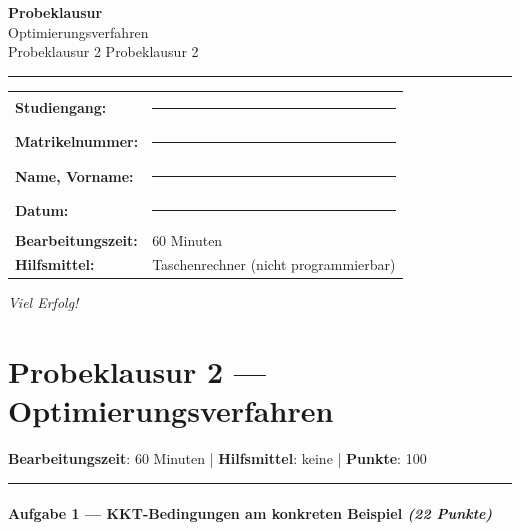 \documentclass[11pt, a4paper]{article}
\providecommand{\nichttitle}{Probeklausur}
\providecommand{\nichtsubtitle}{}
\renewcommand{\nichttitle}{Optimierungsverfahren}
\renewcommand{\nichtsubtitle}{Probeklausur 2}
\begin{document}
\thispagestyle{empty}
\begin{center}
\vspace*{1cm}
{\Huge\bfseries\color{accent}Probeklausur}\\[8pt]
{\Large\color{accent}\nichttitle}\\[4pt]
\ifx\nichtsubtitle\empty\else
  {\large\color{accent!80!black}\nichtsubtitle}\\[6pt]
\fi
\color{accent}\rule{0.5\linewidth}{1pt}\color{black}
\end{center}

\vspace{1cm}
\begin{tabularx}{\textwidth}{@{}l X@{}}
\textbf{Studiengang:}      & \rule{6cm}{0.4pt} \\[6pt]
\textbf{Matrikelnummer:}    & \rule{6cm}{0.4pt} \\[6pt]
\textbf{Name, Vorname:}    & \rule{6cm}{0.4pt} \\[6pt]
\textbf{Datum:}             & \rule{6cm}{0.4pt} \\[6pt]
\textbf{Bearbeitungszeit:}  & 60 Minuten \\[6pt]
\textbf{Hilfsmittel:}       & Taschenrechner (nicht programmierbar) \\
\end{tabularx}

\vspace{2cm}
\begin{center}
{\large\itshape Viel Erfolg!}
\end{center}

\newpage


\section{Probeklausur 2 — Optimierungsverfahren}

\textbf{Bearbeitungszeit}: 60 Minuten | \textbf{Hilfsmittel}: keine | \textbf{Punkte}: 100



\noindent\textcolor{rulegray}{\rule{\linewidth}{0.4pt}}


\paragraph{Aufgabe 1 — KKT-Bedingungen am konkreten Beispiel \textit{(22 Punkte)}}\mbox{}\\[2pt]
\end{document}
